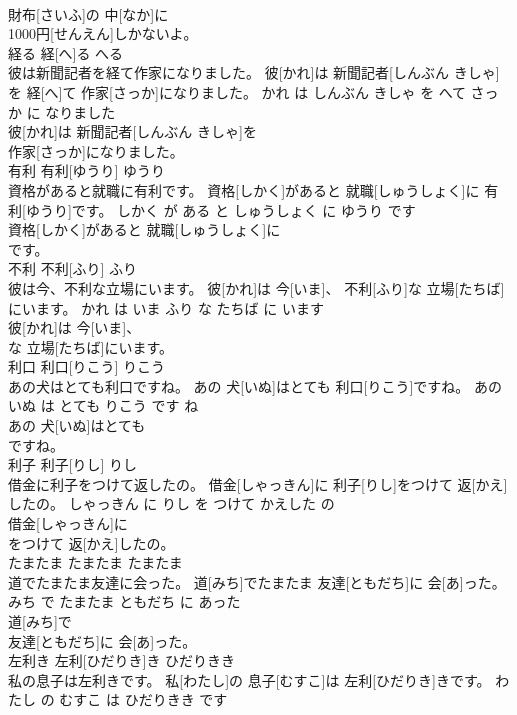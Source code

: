 \documentclass[8pt]{extreport}
\begin{document}
\begin{CJK}{UTF8}{min}
\\	財布[さいふ]の 中[なか]に
\\	1000円[せんえん]しかないよ。			
\\	経る	経[へ]る	へる	
\\	彼は新聞記者を経て作家になりました。	彼[かれ]は 新聞記者[しんぶん きしゃ]を 経[へ]て 作家[さっか]になりました。	かれ は しんぶん きしゃ を へて さっか に なりました	
\\	彼[かれ]は 新聞記者[しんぶん きしゃ]を
\\	作家[さっか]になりました。			
\\	有利	有利[ゆうり]	ゆうり	
\\	資格があると就職に有利です。	資格[しかく]があると 就職[しゅうしょく]に 有利[ゆうり]です。	しかく が ある と しゅうしょく に ゆうり です	
\\	資格[しかく]があると 就職[しゅうしょく]に
\\	です。			
\\	不利	不利[ふり]	ふり	
\\	彼は今、不利な立場にいます。	彼[かれ]は 今[いま]、 不利[ふり]な 立場[たちば]にいます。	かれ は いま ふり な たちば に います	
\\	彼[かれ]は 今[いま]、
\\	な 立場[たちば]にいます。			
\\	利口	利口[りこう]	りこう	
\\	あの犬はとても利口ですね。	あの 犬[いぬ]はとても 利口[りこう]ですね。	あの いぬ は とても りこう です ね	
\\	あの 犬[いぬ]はとても
\\	ですね。			
\\	利子	利子[りし]	りし	
\\	借金に利子をつけて返したの。	借金[しゃっきん]に 利子[りし]をつけて 返[かえ]したの。	しゃっきん に りし を つけて かえした の	
\\	借金[しゃっきん]に
\\	をつけて 返[かえ]したの。			
\\	たまたま	たまたま	たまたま	
\\	道でたまたま友達に会った。	道[みち]でたまたま 友達[ともだち]に 会[あ]った。	みち で たまたま ともだち に あった	
\\	道[みち]で
\\	友達[ともだち]に 会[あ]った。			
\\	左利き	左利[ひだりき]き	ひだりきき	
\\	私の息子は左利きです。	私[わたし]の 息子[むすこ]は 左利[ひだりき]きです。	わたし の むすこ は ひだりきき です	

\end{CJK}
\end{document}

